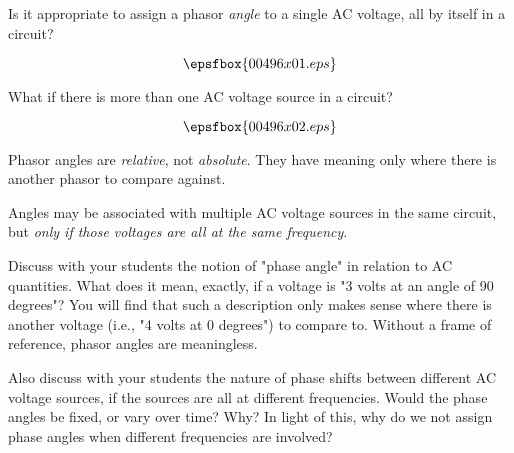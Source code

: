 

Is it appropriate to assign a phasor {\it angle} to a single AC voltage, all by itself in a circuit?

$$\epsfbox{00496x01.eps}$$

What if there is more than one AC voltage source in a circuit?

$$\epsfbox{00496x02.eps}$$







Phasor angles are {\it relative}, not {\it absolute}.  They have meaning only where there is another phasor to compare against.

Angles may be associated with multiple AC voltage sources in the same circuit, but {\it only if those voltages are all at the same frequency}.







Discuss with your students the notion of "phase angle" in relation to AC quantities.  What does it mean, exactly, if a voltage is "3 volts at an angle of 90 degrees"?  You will find that such a description only makes sense where there is another voltage (i.e., "4 volts at 0 degrees") to compare to.  Without a frame of reference, phasor angles are meaningless.

Also discuss with your students the nature of phase shifts between different AC voltage sources, if the sources are all at different frequencies.  Would the phase angles be fixed, or vary over time?  Why?  In light of this, why do we not assign phase angles when different frequencies are involved?




